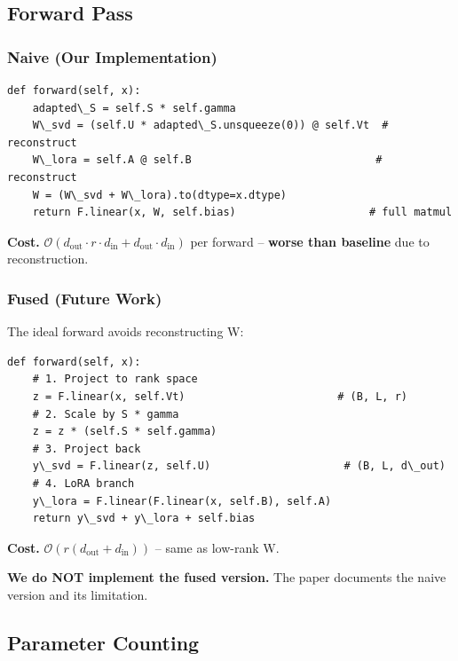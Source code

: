\subsection{Forward Pass}

\subsubsection{Naive (Our Implementation)}

\begin{lstlisting}
def forward(self, x):
    adapted\_S = self.S * self.gamma
    W\_svd = (self.U * adapted\_S.unsqueeze(0)) @ self.Vt  # reconstruct
    W\_lora = self.A @ self.B                             # reconstruct
    W = (W\_svd + W\_lora).to(dtype=x.dtype)
    return F.linear(x, W, self.bias)                     # full matmul
\end{lstlisting}

\textbf{Cost.} $\mathcal{O}(d_\text{out} \cdot r \cdot d_\text{in} + d_\text{out} \cdot d_\text{in})$ 
per forward -- \textbf{worse than baseline} due to reconstruction.

\subsubsection{Fused (Future Work)}

The ideal forward avoids reconstructing W:

\begin{lstlisting}
def forward(self, x):
    # 1. Project to rank space
    z = F.linear(x, self.Vt)                        # (B, L, r)
    # 2. Scale by S * gamma
    z = z * (self.S * self.gamma)
    # 3. Project back
    y\_svd = F.linear(z, self.U)                     # (B, L, d\_out)
    # 4. LoRA branch
    y\_lora = F.linear(F.linear(x, self.B), self.A)
    return y\_svd + y\_lora + self.bias
\end{lstlisting}

\textbf{Cost.} $\mathcal{O}(r(d_\text{out} + d_\text{in}))$ -- same as low-rank W.

\textbf{We do NOT implement the fused version.} The paper documents the naive 
version and its limitation.

\subsection{Parameter Counting}

